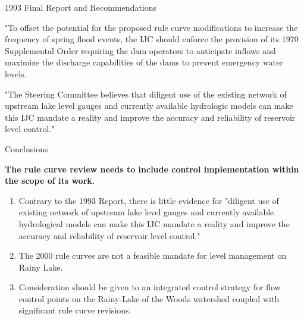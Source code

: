 \documentclass[compress,english]{beamer}
\begin{document}
\begin{frame}{1993 Final Report and Recommendations}

"{\color{red}To offset the potential for the proposed rule curve modifications to increase the frequency of spring flood events}, the IJC should enforce the provision of its 1970 Supplemental Order {\color{red} requiring the dam operators to anticipate inflows and maximize the discharge capabilities of the dams to prevent emergency water levels}. 

"The Steering Committee believes that {\color{red} diligent use of the existing network of upstream lake level gauges and currently available hydrologic models can make this IJC mandate a reality and improve the accuracy and reliability of reservoir level control}." 

\vspace*{3mm}

\end{frame}

\begin{frame}{Conclusions}

{\bf The rule curve review needs to include control implementation within the scope of its work.}

\begin{enumerate}

\item Contrary to the 1993 Report, there is little evidence for "diligent use of existing network of upstream lake level gauges and currently available hydrological models can make this IJC mandate a reality and improve the accuracy and reliability of reservoir level control."

\item The 2000 rule curves are not a feasible mandate for level management on Rainy Lake.

\item  Consideration should be given to an integrated control strategy for flow control points on the Rainy-Lake of the Woods watershed coupled with significant rule curve revisions.
	
\end{enumerate}

\end{frame}
\end{document}
